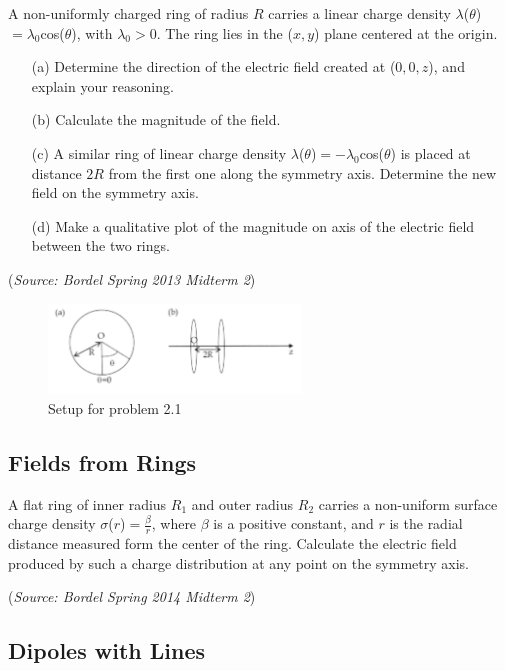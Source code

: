 \documentclass{article}
\begin{document}
A non-uniformly charged ring of radius $R$ carries a linear charge density $\lambda$($\theta$)$=\lambda_0$cos($\theta$), with $\lambda_0>0$. The ring lies in the ($x,y$) plane centered at the origin.
\begin{itemize}
	\item[(a)] Determine the direction of the electric field created at ($0,0,z$), and explain your reasoning.
	\item[(b)] Calculate the magnitude of the field.
	\item[(c)] A similar ring of linear charge density $\lambda$($\theta$)$=-\lambda_0$cos($\theta$) is placed at distance $2R$ from the first one along the symmetry axis. Determine the new field on the symmetry axis.
	\item[(d)] Make a qualitative plot of the magnitude on axis of the electric field between the two rings.
\end{itemize}

(\textit{Source: Bordel Spring 2013 Midterm 2})

\begin{figure}[h]
	\centering
	\includegraphics[width=0.6\textwidth]{BordelProblem.png}
	\caption{Setup for problem 2.1}
	\label{Bordel}
\end{figure}

\subsection{Fields from Rings}

A flat ring of inner radius $R_1$ and outer radius $R_2$ carries a non-uniform surface charge density $\sigma$($r$)$=\frac{\beta}{r}$, where $\beta$ is a positive constant, and $r$ is the radial distance measured form the center of the ring. Calculate the electric field produced by such a charge distribution at any point on the symmetry axis.

(\textit{Source: Bordel Spring 2014 Midterm 2})

\subsection{Dipoles with Lines}
\end{document}
